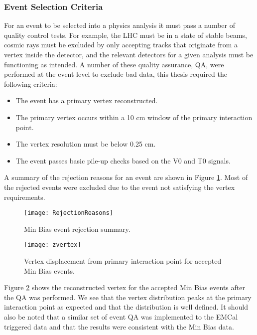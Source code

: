 \subsubsection{Event Selection Criteria}
For an event to be selected into a physics analysis it must pass a number of quality control tests.  For example, the LHC must be in a state of stable beams, cosmic rays must be excluded by only accepting tracks that originate from a vertex inside the detector, and the relevant detectors for a given analysis must be functioning as intended.  A number of these quality assurance, QA, were performed at the event level to exclude bad data, this thesis required the following criteria:

\begin{itemize}
  \item The event has a primary vertex reconstructed.
  \item The primary vertex occurs within a 10 cm window of the primary interaction point.
  \item The vertex resolution must be below 0.25 cm.
  \item The event passes basic pile-up checks based on the V0 and T0 signals.
\end{itemize}


A summary of the rejection reasons for an event are shown in Figure \ref{fig:eventqa}.  Most of the rejected events were excluded due to the event not satisfying the vertex requirements.

\begin{figure}[h]
\texttt{[image: RejectionReasons]}
\centering
\caption{Min Bias event rejection summary.}
\label{fig:eventqa}
\end{figure}

\begin{figure}[h]
\texttt{[image: zvertex]}
\centering
\caption{Vertex displacement from primary interaction point for accepted Min Bias events.}
\label{fig:vertrec}
\end{figure}


Figure \ref{fig:vertrec} shows the reconstructed vertex for the accepted Min Bias events after the QA was performed.  We see that the vertex distribution peaks at the primary interaction point as expected and that the distribution is well defined.  It should also be noted that a similar set of event QA was implemented to the EMCal triggered data and that the results were consistent with the Min Bias data.




